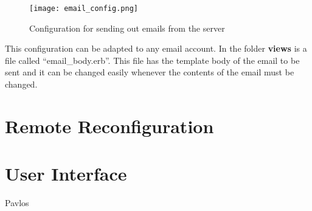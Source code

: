 \begin{figure}[htb]
\centering
\texttt{[image: email\_config.png]}
\caption{Configuration for sending out emails from the server}
\label{fig:email_server}
\end{figure}

This configuration can be adapted to any email account. In the folder {\bf views} is a file called ``email\_body.erb''. This file has the template body of the email to be sent and it can be changed easily whenever the contents of the email must be changed.

\section{Remote Reconfiguration}

\section{User Interface}
Pavlos